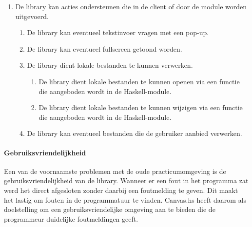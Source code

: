 \begin{enumerate}[label={R\arabic*}]
\setcounter{enumi}{\value{startvalue}}
	\item De library kan acties ondersteunen die in de client of door de module worden uitgevoerd.
	\begin{enumerate}[label={R\arabic{enumi}.\arabic*}]
		\item \label{req:action:prompt} De library kan eventueel tekstinvoer vragen met een pop-up.
		\item \label{req:action:fullscreen} De library kan eventueel fullscreen getoond worden.
		\item \label{req:action:localfiles} De library dient lokale bestanden te kunnen verwerken.
		\begin{enumerate}[label={R\arabic{enumi}.\arabic{enumii}.\arabic*}]
			\item De library dient lokale bestanden te kunnen openen via een functie die aangeboden wordt in de Haskell-module.
			\item De library dient lokale bestanden te kunnen wijzigen via een functie die aangeboden wordt in de Haskell-module.
		\end{enumerate}
		
		\item \label{req:action:userfiles} De library kan eventueel bestanden die de gebruiker aanbied verwerken.
	\end{enumerate}
	\setcounter{startvalue}{\value{enumi}}
\end{enumerate}

\paragraph{Gebruiksvriendelijkheid} Een van de voornaamste problemen met de oude practicumomgeving is de gebruiksvriendelijkheid van de library. Wanneer er een fout in het programma zat werd het direct afgesloten zonder daarbij een foutmelding te geven. Dit maakt het lastig om fouten in de programmatuur te vinden. Canvas.hs heeft daarom als doelstelling om een gebruiksvriendelijke omgeving aan te bieden die de programmeur duidelijke foutmeldingen geeft.

